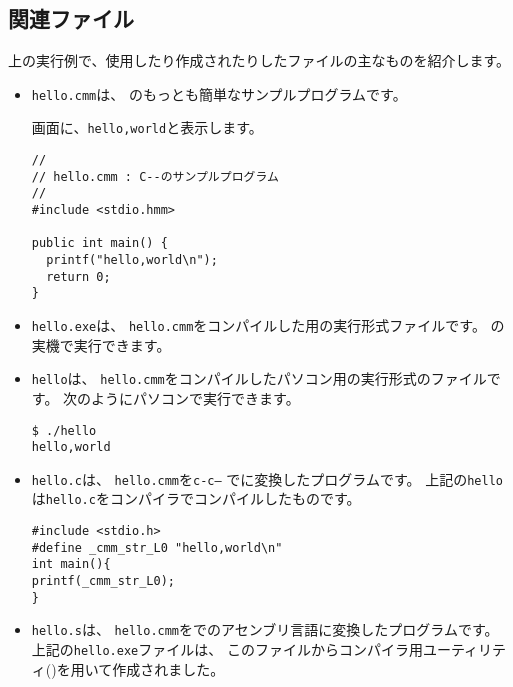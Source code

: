 \subsection{関連ファイル}

上の実行例で、使用したり作成されたりしたファイルの主なものを紹介します。

\begin{itemize}

\item {\tt hello.cmm}は、
\cmml のもっとも簡単なサンプルプログラムです。

画面に、\verb/hello,world/と表示します。

\begin{mylist}
\begin{verbatim}
//
// hello.cmm : C--のサンプルプログラム
//
#include <stdio.hmm>

public int main() {
  printf("hello,world\n");
  return 0;
}
\end{verbatim}
\end{mylist}

\item {\tt hello.exe}は、
\verb/hello.cmm/をコンパイルした\tacos 用の実行形式ファイルです。
\tac の実機で実行できます。

\item {\tt hello}は、
\verb/hello.cmm/をコンパイルしたパソコン用の実行形式のファイルです。
次のようにパソコンで実行できます。

\begin{mylist}
\begin{verbatim}
$ ./hello 
hello,world
\end{verbatim}
\end{mylist}

\item {\tt hello.c}は、
\verb/hello.cmm/を{\tt c-c--} で\cl に変換したプログラムです。
上記の{\tt hello}は{\tt hello.c}を\cl コンパイラでコンパイルしたものです。

\begin{mylist}
\begin{verbatim}
#include <stdio.h>
#define _cmm_str_L0 "hello,world\n"
int main(){
printf(_cmm_str_L0);
}
\end{verbatim}
\end{mylist}

\item {\tt hello.s}は、
\verb/hello.cmm/を\cmmc で\tac のアセンブリ言語に変換したプログラムです。
上記の{\tt hello.exe}ファイルは、
このファイルから\cmm コンパイラ用ユーティリティ(\util)を用いて作成されました。


\end{itemize}
